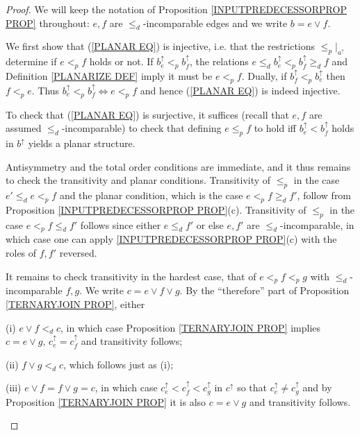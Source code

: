 \documentclass[a4paper,10pt]{article}%
\begin{document}
\begin{proof}
We will keep the notation of Proposition \ref{INPUTPREDECESSORPROP PROP} throughout: $e, f$ are $\leq_d$-incomparable edges and we write $b = e \vee f$. 

	We first show that (\ref{PLANAR EQ}) is injective, i.e. that the restrictions $\leq_p|_{a^{\uparrow}}$ determine if 
	$e <_p f$ holds or not.
If $b^{\uparrow}_e <_p b^{\uparrow}_f$, the relations
$e \leq_d b^{\uparrow}_e <_p b^{\uparrow}_f \geq_d f$
and Definition \ref{PLANARIZE DEF} imply it must be $e <_p f$.
Dually, if $b^{\uparrow}_f <_p b^{\uparrow}_e$ then 
$f <_p e$. Thus 
$b^{\uparrow}_e <_p b^{\uparrow}_f \Leftrightarrow e <_p f$ and hence (\ref{PLANAR EQ}) is indeed injective.

To check that (\ref{PLANAR EQ}) is surjective, it suffices (recall that $e,f$ are assumed $\leq_d$-incomparable) to check that
defining $e \leq_p f$ to hold iff $b^{\uparrow}_e < b^{\uparrow}_f$ holds in $b^{\uparrow}$ yields a planar structure.

Antisymmetry and the total order conditions are immediate, and it thus remains to check the transitivity and planar conditions.
Transitivity of $\leq_p$ in the case $e' \leq_d e <_p f$ and the planar condition, which is the case $e <_p f \geq_d f'$, follow from Proposition \ref{INPUTPREDECESSORPROP PROP}(c). Transitivity of $\leq_p$ in the case $e <_p f \leq_d f'$
follows since either $e \leq_d f'$ or else $e,f'$ are $\leq_d$-incomparable, in which case one can apply \ref{INPUTPREDECESSORPROP PROP}(c) with the roles of $f,f'$ reversed.

It remains to check transitivity in the hardest case, that of 
$e <_p f <_p g$ with $\leq_d$-incomparable $f,g$.
We write $c = e \vee f \vee g$.
By the ``therefore'' part of Proposition \ref{TERNARYJOIN PROP}, either
\begin{inparaenum}
	\item[(i)] $e \vee f <_d c$, in which case 
	Proposition \ref{TERNARYJOIN PROP}
	implies 
	$c=e \vee g$,
	$c^{\uparrow}_e = c^{\uparrow}_f$ and transitivity follows;
	\item[(ii)] $f \vee g <_d c$, which follows just as (i);
	\item[(iii)]  
$e \vee f = f \vee g =c$, in which case 
$c^{\uparrow}_e <
c^{\uparrow}_f <
c^{\uparrow}_g $ in $c^{\uparrow}$
so that $c^{\uparrow}_e \neq c^{\uparrow}_g$ and by Proposition \ref{TERNARYJOIN PROP} it is also 
$c = e \vee g$ and transitivity follows.
\end{inparaenum}
\end{proof}
\end{document}
